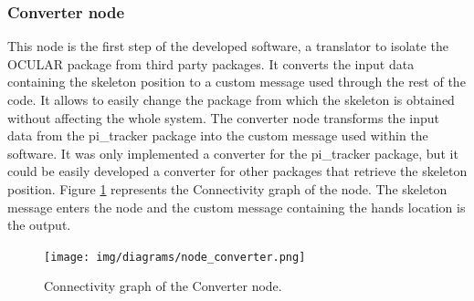 




\subsubsection{Converter node}
		\label{converter}

	This node is the first step of the developed software, a translator to isolate the OCULAR package from third party packages. 
	It converts the input data containing the skeleton position to a custom message used through the rest of the code. 
	It allows to easily change the package from which the skeleton is obtained without affecting the whole system. 
	The converter node transforms the input data from the pi\_tracker package into the custom message used within the software. 
	It was only implemented a converter for the pi\_tracker package, but it could be easily developed a converter for other packages that retrieve the skeleton position. 
	Figure \ref{node_converter} represents the Connectivity graph of the node. 
	The skeleton message enters the node and the custom message containing the hands location is the output. 

		\begin{figure}[H]
			\begin{center}
			\texttt{[image: img/diagrams/node\_converter.png]}
			\caption[Converter node I/O]{Connectivity graph of the Converter node.}		
			\label{node_converter}
			\end{center}
		\end{figure}

